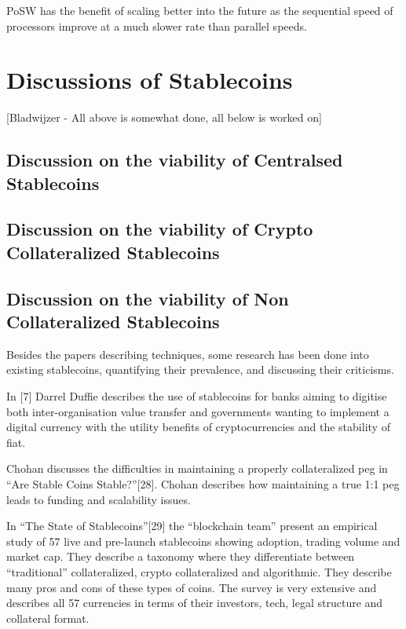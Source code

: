 \documentclass[english,]{IEEEtran}
\begin{document}
PoSW has the benefit of scaling better into the future as the sequential
speed of processors improve at a much slower rate than parallel speeds.

\section{Discussions of Stablecoins}\label{discussions-of-stablecoins}

{[}Bladwijzer - All above is somewhat done, all below is worked on{]}

\subsection{Discussion on the viability of Centralsed
Stablecoins}\label{discussion-on-the-viability-of-centralsed-stablecoins}

\subsection{Discussion on the viability of Crypto Collateralized
Stablecoins}\label{discussion-on-the-viability-of-crypto-collateralized-stablecoins}

\subsection{Discussion on the viability of Non Collateralized
Stablecoins}\label{discussion-on-the-viability-of-non-collateralized-stablecoins}

Besides the papers describing techniques, some research has been done
into existing stablecoins, quantifying their prevalence, and discussing
their criticisms.

In {[}7{]} Darrel Duffie describes the use of stablecoins for banks
aiming to digitise both inter-organisation value transfer and
governments wanting to implement a digital currency with the utility
benefits of cryptocurrencies and the stability of fiat.

Chohan discusses the difficulties in maintaining a properly
collateralized peg in ``Are Stable Coins Stable?''{[}28{]}. Chohan
describes how maintaining a true 1:1 peg leads to funding and
scalability issues.

In ``The State of Stablecoins''{[}29{]} the ``blockchain team'' present
an empirical study of 57 live and pre-launch stablecoins showing
adoption, trading volume and market cap. They describe a taxonomy where
they differentiate between ``traditional'' collateralized, crypto
collateralized and algorithmic. They describe many pros and cons of
these types of coins. The survey is very extensive and describes all 57
currencies in terms of their investors, tech, legal structure and
collateral format.
\end{document}
